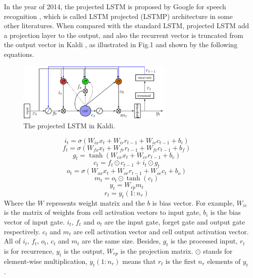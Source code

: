 \documentclass[a4paper]{article}
\begin{document}
In the year of 2014, the projected LSTM is proposed by Google for speech recognition \cite{lstm-asr},
which is called LSTM projected (LSTMP) architecture in some other literatures.
When compared with the standard LSTM, projected LSTM add a projection layer to the output,
and also the recurrent vector is truncated from the output vector in Kaldi \cite{kaldi}, as illustrated in Fig.1 and shown by the following equations.
\begin{figure}
\centering
  \includegraphics[width=3.0in]{lstmp-kaldi.eps}
  \caption{The projected LSTM in Kaldi.}
\end{figure}
\begin{equation}\label{1}
i_t=\sigma(W_{ix}x_t+W_{ir}r_{t-1}+W_{ic}c_{t-1}+b_i)
\end{equation}
\begin{equation}\label{2}
f_t=\sigma(W_{fx}x_t+W_{fr}r_{t-1}+W_{fc}c_{t-1}+b_f)
\end{equation}
\begin{equation}\label{3}
g_t=\tanh(W_{cx}x_t+W_{cr}r_{t-1}+b_c)
\end{equation}
\begin{equation}\label{4}
c_t=f_t\odot c_{t-1}+i_t\odot g_t
\end{equation}
\begin{equation}\label{5}
o_t=\sigma(W_{ox}x_t+W_{or}r_{t-1}+W_{oc}c_{t}+b_o)
\end{equation}
\begin{equation}\label{6}
m_t=o_t\odot \tanh(c_t)
\end{equation}
\begin{equation}\label{7}
y_t=W_{rp}m_t
\end{equation}
\begin{equation}\label{8}
r_t={y_t}(1:n_r)
\end{equation}
Where the $W$ represents weight matrix and the $b$ is bias vector. For example, $W_{ic}$ is the matrix of weights from cell activation vectors to input gate,
$b_i$ is the bias vector of input gate. $i_t$, $f_t$ and $o_t$ are the input gate, forget gate and output gate respectively.
$c_t$ and $m_t$ are cell activation vector and cell output activation vector.
All of $i_t$, $f_t$, $o_t$, $c_t$ and $m_t$ are the same size. Besides, $g_t$ is the processed input, $r_t$ is for recurrence, $y_t$ is the output, $W_{rp}$ is the projection matrix.
$\odot$ stands for element-wise multiplication, ${y_t}(1:n_r)$ means that $r_t$ is the first $n_r$ elements of $y_t$.
\end{document}
